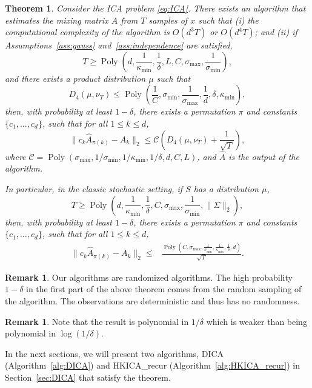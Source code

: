 \documentclass[jmlr]{article}
\DeclareMathOperator{\pol}{Poly}
\newcommand{\poly}[1]{\pol\left(#1\right)}
\newtheorem{thm}[lemma]{Theorem}
\theoremstyle{definition}
\newtheorem{remark}[lemma]{Remark}
\begin{document}
\begin{thm}
\label{thm:finalRes} Consider the ICA problem \eqref{eq:ICA}. There exists an algorithm that estimates the mixing matrix $A$ from $T$ samples of $x$ such that (i) the computational complexity of the algorithm is $O(d^3 T)$ or $O(d^4 T)$; and (ii) if Assumptions~\ref{ass:gauss} and~\ref{ass:independence} are satisfied,
\[
T \ge \poly{d, \frac{1}{\kappa_{\min}}, \frac{1}{\delta}, L, C, \sigma_{\max}, \frac{1}{\sigma_{\min}}},
\]
and there exists a product distribution  $\mu$  such that 
\[
D_4(\mu, \nu_T) \le \poly{\frac{1}{C},  \sigma_{\min},  \frac{1}{\sigma_{\max}},\frac{1}{d}, \delta, \kappa_{\min}},
\]
then, with probability at least $1-\delta$, there exists a permutation $\pi$ and constants $\{c_1,\ldots,c_d\}$, such that for all $1\le k\le d$,
\[
\| c_k\hat{A}_{\pi(k)} - A_k\|_2 \le \mathcal{C}\left(D_4(\mu, \nu_T)+\frac{1}{\sqrt{T}}\right),
\]
where $\mathcal{C} = \poly{\sigma_{\max}, 1/\sigma_{\min}, 1/\kappa_{\min},1/\delta, d, C, L}$, and $\hat{A}$ is the output of the algorithm.

In particular, in the classic stochastic setting, if $S$ has a distribution $\mu$, 
\[
T \ge \poly{d, \frac{1}{\kappa_{\min}}, \frac{1}{\delta}, C, \sigma_{\max}, \frac{1}{\sigma_{\min}}, \|\Sigma\|_2},
\]
then, with probability at least $1-\delta$, there exists a permutation $\pi$ and constants $\{c_1,\ldots,c_d\}$, such that for all $1\le k\le d$,
\begin{align*}
 \| c_k\hat{A}_{\pi(k)} - A_k\|_2 \le 
& \frac{\poly{C, \sigma_{\max}, \frac{1}{\sigma_{\min}}, \frac{1}{\kappa_{\min}},\frac{1}{\delta}, d}}{\sqrt{T}}.
\end{align*}
\end{thm}
\begin{remark}
Our algorithms are randomized algorithms. The high probability $1-\delta$ in the first part of the above theorem comes from the random sampling of the algorithm. The observations are deterministic and thus has no randomness. 
\end{remark}
\begin{remark} %
Note that the result is polynomial in $1/\delta$ which is weaker than being polynomial in $\log(1/\delta)$.
\end{remark}

In the next sections, we will present two algorithms, DICA (Algorithm~\ref{alg:DICA}) and HKICA\_recur (Algorithm~\ref{alg:HKICA_recur}) in Section~\ref{sec:DICA} that 
satisfy the theorem.
\end{document}
